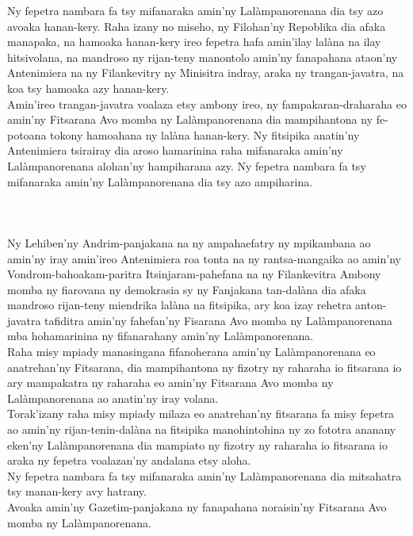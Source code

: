 \documentclass[12pt]{article}
\newcounter{laharana}
\newcommand{\andininy}[0]{
  \paragraph{%
    \NoCaseChange{%
      Andininy~\addtocounter{laharana}{1}\thelaharana.}\label{and:\thelaharana}~%
  }%
}
\begin{document}
\noindent
Ny fepetra nambara fa tsy mifanaraka amin'ny Lalàmpanorenana dia tsy azo avoaka
hanan-kery. Raha izany no miseho, ny Filohan'ny Repoblika dia afaka manapaka, na
hamoaka hanan-kery ireo fepetra hafa amin'ilay lalàna na ilay hitsivolana, na
mandroso ny rijan-teny manontolo amin'ny fanapahana ataon'ny Antenimiera na ny
Filankevitry ny Minisitra indray, araka ny trangan-javatra, na koa tsy hamoaka
azy hanan-kery.\\

\noindent
Amin'ireo trangan-javatra voalaza etsy ambony ireo, ny fampakaran-draharaha eo
amin'ny Fitsarana Avo momba ny Lalàmpanorenana dia mampihantona ny fe-potoana
tokony hamoahana ny lalàna hanan-kery. Ny fitsipika anatin'ny Antenimiera
tsirairay dia aroso hamarinina raha mifanaraka amin'ny Lalàmpanorenana alohan'ny
hampiharana azy. Ny fepetra nambara fa tsy mifanaraka amin'ny Lalàmpanorenana
dia tsy azo ampiharina.

\andininy{}Ny Lehiben'ny Andrim-panjakana na ny ampahaefatry ny mpikambana ao
amin'ny iray amin'ireo Antenimiera roa tonta na ny rantsa-mangaika ao amin'ny
Vondrom-bahoakam-paritra Itsinjaram-pahefana na ny Filankevitra Ambony momba ny
fiarovana ny demokrasia sy ny Fanjakana tan-dalàna dia afaka mandroso rijan-teny
miendrika lalàna na fitsipika, ary koa izay rehetra anton-javatra tafiditra
amin'ny fahefan'ny Fisarana Avo momba ny Lalàmpanorenana mba hohamarinina ny
fifanarahany amin'ny Lalàmpanorenana.\\

\noindent
Raha misy mpiady manasingana fifanoherana amin'ny Lalàmpanorenana eo
anatrehan'ny Fitsarana, dia mampihantona ny fizotry ny raharaha io fitsarana io
ary mampakatra ny raharaha eo amin'ny Fitsarana Avo momba ny Lalàmpanorenana ao
anatin'ny iray volana.\\

\noindent
Torak'izany raha misy mpiady milaza eo anatrehan'ny fitsarana fa misy fepetra ao
amin'ny rijan-tenin-dalàna na fitsipika manohintohina ny zo fototra ananany
eken'ny Lalàmpanorenana dia mampiato ny fizotry ny raharaha io fitsarana io
araka ny fepetra voalazan'ny andalana etsy aloha.\\

\noindent
Ny fepetra nambara fa tsy mifanaraka amin'ny Lalàmpanorenana dia mitsahatra tsy
manan-kery avy hatrany.\\

\noindent
Avoaka amin'ny Gazetim-panjakana ny fanapahana noraisin'ny Fitsarana Avo momba
ny Lalàmpanorenana.
\end{document}
